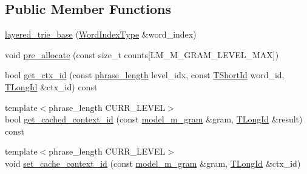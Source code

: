 \subsection*{Public Member Functions}
\begin{DoxyCompactItemize}
\item 
\hyperlink{classuva_1_1smt_1_1bpbd_1_1server_1_1lm_1_1layered__trie__base_a9ddc4afa85f5830cf6a8e0c748b1ac15}{layered\+\_\+trie\+\_\+base} (\hyperlink{classuva_1_1smt_1_1bpbd_1_1server_1_1lm_1_1word__index__trie__base_a64279b5b94c421b25aedaa72e73d013c}{Word\+Index\+Type} \&word\+\_\+index)
\item 
void \hyperlink{classuva_1_1smt_1_1bpbd_1_1server_1_1lm_1_1layered__trie__base_ad7e4f621bb7694c347e2603ff91942b0}{pre\+\_\+allocate} (const size\+\_\+t counts\mbox{[}L\+M\+\_\+\+M\+\_\+\+G\+R\+A\+M\+\_\+\+L\+E\+V\+E\+L\+\_\+\+M\+A\+X\mbox{]})
\item 
bool \hyperlink{classuva_1_1smt_1_1bpbd_1_1server_1_1lm_1_1layered__trie__base_a1cf844fd77f1f0ee5340fe6a80a98731}{get\+\_\+ctx\+\_\+id} (const \hyperlink{namespaceuva_1_1smt_1_1bpbd_1_1server_af068a19c2e03116caf3e3827a3e40e35}{phrase\+\_\+length} level\+\_\+idx, const \hyperlink{namespaceuva_1_1smt_1_1bpbd_1_1server_1_1lm_1_1identifiers_a33043a191e9a637dea742a89d23c8bdc}{T\+Short\+Id} word\+\_\+id, \hyperlink{namespaceuva_1_1smt_1_1bpbd_1_1server_1_1lm_1_1identifiers_a6841847096e455ad3c38689bc548b3b0}{T\+Long\+Id} \&ctx\+\_\+id) const 
\item 
{\footnotesize template$<$phrase\+\_\+length C\+U\+R\+R\+\_\+\+L\+E\+V\+E\+L$>$ }\\bool \hyperlink{classuva_1_1smt_1_1bpbd_1_1server_1_1lm_1_1layered__trie__base_afab3ea561dcdfe4749c3c09161373f47}{get\+\_\+cached\+\_\+context\+\_\+id} (const \hyperlink{classuva_1_1smt_1_1bpbd_1_1server_1_1lm_1_1m__grams_1_1model__m__gram}{model\+\_\+m\+\_\+gram} \&gram, \hyperlink{namespaceuva_1_1smt_1_1bpbd_1_1server_1_1lm_1_1identifiers_a6841847096e455ad3c38689bc548b3b0}{T\+Long\+Id} \&result) const 
\item 
{\footnotesize template$<$phrase\+\_\+length C\+U\+R\+R\+\_\+\+L\+E\+V\+E\+L$>$ }\\void \hyperlink{classuva_1_1smt_1_1bpbd_1_1server_1_1lm_1_1layered__trie__base_ab0314708e05d1dd5695d36e6d742ee24}{set\+\_\+cache\+\_\+context\+\_\+id} (const \hyperlink{classuva_1_1smt_1_1bpbd_1_1server_1_1lm_1_1m__grams_1_1model__m__gram}{model\+\_\+m\+\_\+gram} \&gram, \hyperlink{namespaceuva_1_1smt_1_1bpbd_1_1server_1_1lm_1_1identifiers_a6841847096e455ad3c38689bc548b3b0}{T\+Long\+Id} \&ctx\+\_\+id)
\end{DoxyCompactItemize}
